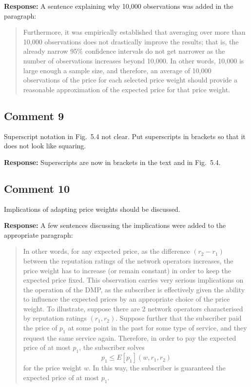 \documentclass[10pt,a4paper,notitlepage]{article}
\numberwithin{equation}{section}
\begin{document}
\textbf{Response:}
A sentence explaining why 10,000 observations was added in the paragraph:
\begin{quote}
Furthermore, it was empirically established that averaging over more than 10,000 observations does not drastically improve the results; that is, the already narrow 95\% confidence intervals do not get narrower as the number of observations increases beyond 10,000. In other words, 10,000 is large enough a sample size, and therefore, an average of 10,000 observations of the price for each selected price weight should provide a reasonable approximation of the expected price for that price weight.
\end{quote}

\subsection{Comment 9}
Superscript notation in Fig.~5.4 not clear. Put superscripts in brackets so that it does not look like squaring.

\textbf{Response:}
Superscripts are now in brackets in the text and in Fig.~5.4.

\subsection{Comment 10}
Implications of adapting price weights should be discussed.

\textbf{Response:}
A few sentences discussing the implications were added to the appropriate paragraph:
\begin{quote}
In other words, for any expected price, as the difference $(r_2-r_1)$ between the reputation ratings of the network operators increases, the price weight has to increase (or remain constant) in order to keep the expected price fixed. This observation carries very serious implications on the operation of the DMP, as the subscriber is effectively given the ability to influence the expected prices by an appropriate choice of the price weight. To illustrate, suppose there are 2 network operators characterised by reputation ratings $(r_1, r_2)$. Suppose further that the subscriber paid the price of $p_1$ at some point in the past for some type of service, and they request the same service again. Therefore, in order to pay the expected price of at most $p_1$, the subscriber solves
\begin{equation}
p_1 \le E[p_1](w, r_1, r_2)
\end{equation}
for the price weight $w$. In this way, the subscriber is guaranteed the expected price of at most $p_1$.
\end{quote}
\end{document}
